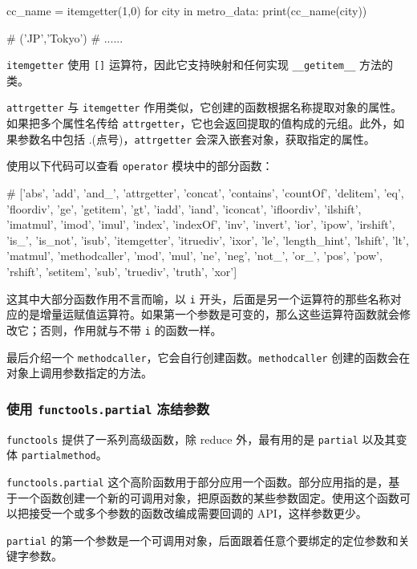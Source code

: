 \begin{python}
cc_name = itemgetter(1,0)
for city in metro_data:
    print(cc_name(city))

# ('JP','Tokyo')
# ......
\end{python}

\texttt{itemgetter} 使用 \texttt{[]} 运算符，因此它支持映射和任何实现 \texttt{\_\_getitem\_\_} 方法的类。

\texttt{attrgetter} 与 \texttt{itemgetter} 作用类似，它创建的函数根据名称提取对象的属性。如果把多个属性名传给 \texttt{attrgetter}，它也会返回提取的值构成的元组。此外，如果参数名中包括 .(点号)，\texttt{attrgetter} 会深入嵌套对象，获取指定的属性。



使用以下代码可以查看 \texttt{operator} 模块中的部分函数：
\begin{python}
# ['abs', 'add', 'and_', 'attrgetter', 'concat', 'contains', 'countOf', 'delitem', 'eq', 'floordiv', 'ge', 'getitem', 'gt', 'iadd', 'iand', 'iconcat', 'ifloordiv', 'ilshift', 'imatmul', 'imod', 'imul', 'index', 'indexOf', 'inv', 'invert', 'ior', 'ipow', 'irshift', 'is_', 'is_not', 'isub', 'itemgetter', 'itruediv', 'ixor', 'le', 'length_hint', 'lshift', 'lt', 'matmul', 'methodcaller', 'mod', 'mul', 'ne', 'neg', 'not_', 'or_', 'pos', 'pow', 'rshift', 'setitem', 'sub', 'truediv', 'truth', 'xor']
\end{python}

这其中大部分函数作用不言而喻，以 \texttt{i} 开头，后面是另一个运算符的那些名称对应的是增量运赋值运算符。如果第一个参数是可变的，那么这些运算符函数就会修改它；否则，作用就与不带 \texttt{i} 的函数一样。

最后介绍一个 \texttt{methodcaller}，它会自行创建函数。\texttt{methodcaller} 创建的函数会在对象上调用参数指定的方法。



\subsubsection{使用 \texttt{functools.partial} 冻结参数}

\texttt{functools} 提供了一系列高级函数，除 \textrm{reduce} 外，最有用的是 \texttt{partial} 以及其变体 \texttt{partialmethod}。

\texttt{functools.partial} 这个高阶函数用于部分应用一个函数。部分应用指的是，基于一个函数创建一个新的可调用对象，把原函数的某些参数固定。使用这个函数可以把接受一个或多个参数的函数改编成需要回调的 API，这样参数更少。



\texttt{partial} 的第一个参数是一个可调用对象，后面跟着任意个要绑定的定位参数和关键字参数。








\newpage